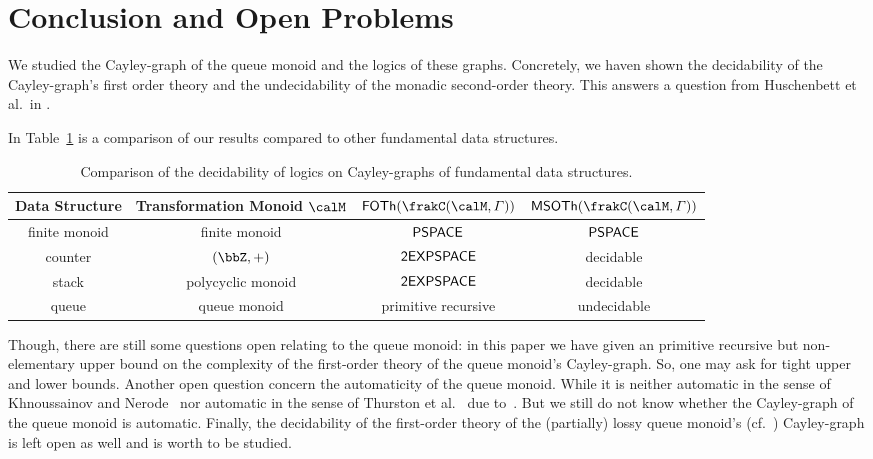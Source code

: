 \section{Conclusion and Open Problems}
We studied the Cayley-graph of the queue monoid and the logics of these graphs. Concretely, we haven shown the decidability of the Cayley-graph's first order theory and the undecidability of the monadic second-order theory. This answers a question from Huschenbett et al.\ in \cite{HusKZ17}.

In Table~\ref{tab:conclusion} is a comparison of our results compared to other fundamental data structures.

\begin{table}[h]
	\begin{tabular}{cc|cc}
		Data Structure & Transformation Monoid $\calM$ & $\FOTh{\cayley{\calM}{\varGamma}}$ & $\MSOTh{\cayley{\calM}{\varGamma}}$\\
		\hline
		\hline
		finite monoid & finite monoid & $\mathsf{PSPACE}$ \cite{Graedel03} & $\mathsf{PSPACE}$ \cite{Graedel03}\\
		counter & $(\bbZ,+)$ & $\mathsf{2EXPSPACE}$ \cite{KusL11} & decidable \cite{KusL06}\\
		stack & polycyclic monoid & $\mathsf{2EXPSPACE}$ \cite{KusL11} & decidable \cite{KusL06}\\
		queue & queue monoid & primitive recursive & undecidable
	\end{tabular}
	\caption{Comparison of the decidability of logics on Cayley-graphs of fundamental data structures.\label{tab:conclusion}}
\end{table}

Though, there are still some questions open relating to the queue monoid: in this paper we have given an primitive recursive but non-elementary upper bound on the complexity of the first-order theory of the queue monoid's Cayley-graph. So, one may ask for tight upper and lower bounds.
Another open question concern the automaticity of the queue monoid. While it is neither automatic in the sense of Khnoussainov and Nerode~\cite{KN95} nor automatic in the sense of Thurston et al.~\cite{CEHLPT92} due to~\cite{HusKZ17}. But we still do not know whether the Cayley-graph of the queue monoid is automatic.
Finally, the decidability of the first-order theory of the (partially) lossy queue monoid's (cf.~\cite{KKP18,Koe18}) Cayley-graph is left open as well and is worth to be studied.